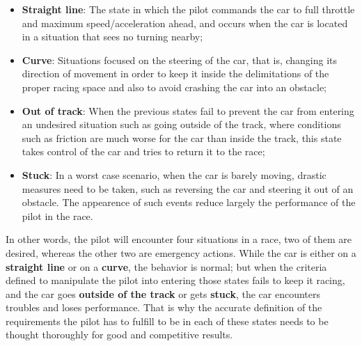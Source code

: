 \begin{itemize}
	\item \textbf{Straight line}: The state in which the pilot commands the car to full throttle and maximum speed/acceleration ahead, and occurs when the car is located in a situation that sees no turning nearby;
	
	\item \textbf{Curve}: Situations focused on the steering of the car, that is, changing its direction of movement in order to keep it inside the delimitations of the proper racing space and also to avoid crashing the car into an obstacle;
	
	\item \textbf{Out of track}: When the previous states fail to prevent the car from entering an undesired situation such as going outside of the track, where conditions such as friction are much worse for the car than inside the track, this state takes control of the car and tries to return it to the race;
	
	\item \textbf{Stuck}: In a worst case scenario, when the car is barely moving, drastic measures need to be taken, such as reversing the car and steering it out of an obstacle. The appearence of such events reduce largely the performance of the pilot in the race.
\end{itemize}

In other words, the pilot will encounter four situations in a race, two of them are desired, whereas the other two are emergency actions. While the car is either on a \textbf{straight line} or on a \textbf{curve}, the behavior is normal; but when the criteria defined to manipulate the pilot into entering those states fails to keep it racing, and the car goes \textbf{outside of the track} or gets \textbf{stuck}, the car encounters troubles and loses performance. That is why the accurate definition of the requirements the pilot has to fulfill to be in each of these states needs to be thought thoroughly for good and competitive results.

